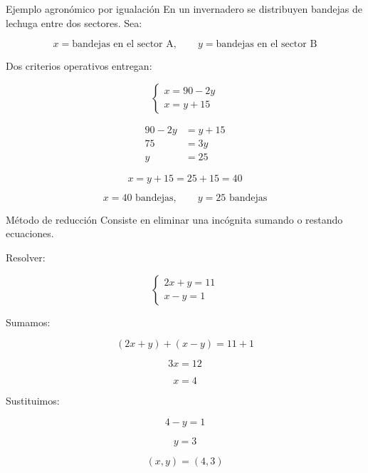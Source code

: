 \documentclass[aspectratio=169]{beamer}
\begin{document}
\begin{frame}{Ejemplo agronómico por igualación}
	\small
	En un invernadero se distribuyen bandejas de lechuga entre dos sectores. Sea:
	
	\[
	x=\text{bandejas en el sector A}, \qquad y=\text{bandejas en el sector B}
	\]
	
	Dos criterios operativos entregan:
	
	\[
	\begin{cases}
		x=90-2y\\
		x=y+15
	\end{cases}
	\]
	
	\begin{align*}
	90-2y&=y+15\\
	75&=3y\\
	y&=25
	\end{align*}
	
	\[
	x=y+15=25+15=40
	\]
	
	\[
	\boxed{x=40\text{ bandejas},\qquad y=25\text{ bandejas}}
	\]
\end{frame}
	
\begin{frame}{Método de reducción}
	Consiste en eliminar una incógnita sumando o restando ecuaciones.
	
	\bigskip
	
	Resolver:
	
	\[
	\begin{cases}
		2x+y=11\\
		x-y=1
	\end{cases}
	\]
	
	Sumamos:
	
	\[
	(2x+y)+(x-y)=11+1
	\]
	
	\[
	3x=12
	\]
	
	\[
	x=4
	\]
	
	Sustituimos:
	
	\[
	4-y=1
	\]
	
	\[
	y=3
	\]
	
	\[
	\boxed{(x,y)=(4,3)}
	\]
\end{frame}
\end{document}

